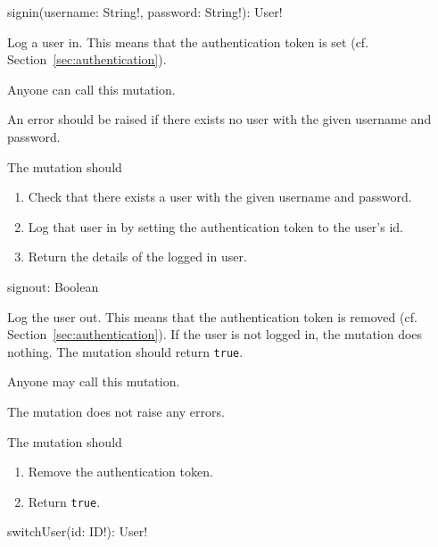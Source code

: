
\begin{code}
signin(username: String!, password: String!): User!
\end{code}

Log a user in. This means that the authentication token is set (cf. Section~\ref{sec:authentication}).

\restrictions

Anyone can call this mutation.

\errors

An error should be raised if there exists no user with the given username and password.

\functionality

The mutation should

\begin{enumerate}
    \item Check that there exists a user with the given username and password.
    \item Log that user in by setting the authentication token to the user's id.
    \item Return the details of the logged in user.
\end{enumerate}


\begin{code}
signout: Boolean
\end{code}

Log the user out. This means that the authentication token is removed (cf. Section~\ref{sec:authentication}). If the user is not logged in, the mutation does nothing. The mutation should return \verb|true|.

\restrictions

Anyone may call this mutation.

\errors
The mutation does not raise any errors.

\functionality

The mutation should

\begin{enumerate}
    \item Remove the authentication token.
    \item Return \verb|true|.
\end{enumerate}


\begin{code}
switchUser(id: ID!): User!
\end{code}


